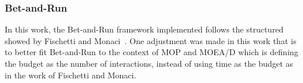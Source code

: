 \subsubsection{Bet-and-Run}

In this work, the Bet-and-Run framework implemented follows the structured showed by Fischetti and Monaci~\cite{fischetti2014exploiting}. One adjustment was made in this work that is to better fit Bet-and-Run to the context of MOP and MOEA/D which is defining the budget as the number of interactions, instead of using time as the budget as in the work of Fischetti and Monaci.


